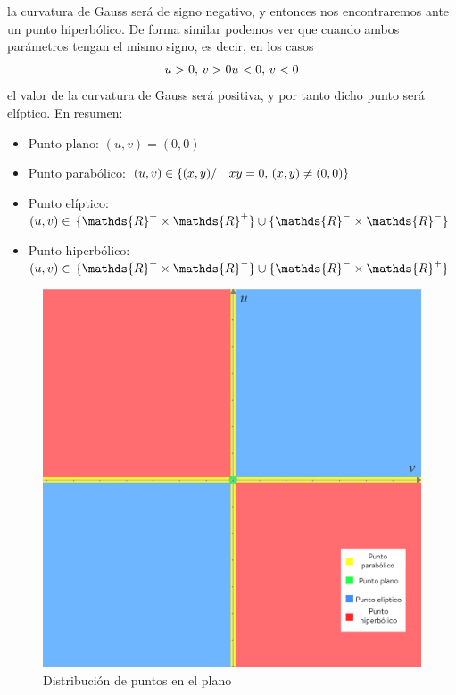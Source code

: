 \documentclass[fleqn]{article}
\def\R{\mathds{R}}
\begin{document}
    la curvatura de Gauss será de signo negativo, y entonces nos encontraremos ante un punto hiperbólico. De forma similar podemos ver que cuando ambos parámetros 
    tengan el mismo signo, es decir, en los casos
    \begin{equation*}
        u>0, \thinspace v>0 \\
        u<0, \thinspace v<0
    \end{equation*}
    el valor de la curvatura de Gauss será positiva, y por tanto dicho punto será elíptico. En resumen:
    \begin{itemize}
        \item Punto plano: $(u,v) = (0,0)$
        \item Punto parabólico: $(u,v) \in \{(x,y)/ \quad xy=0, \thinspace (x,y)\neq (0,0)\}$ 
        \item Punto elíptico: $(u,v) \in \thinspace \{\R^+ \times \R^+\} \cup \{\R^- \times \R^-\}$
        \item Punto hiperbólico: $(u,v) \in \thinspace \{\R^+ \times \R^-\} \cup \{\R^- \times \R^+\}$
    \end{itemize}
    \begin{figure}
        \centering
        \includegraphics[scale = 0.2]{grafica.png}
        \caption{Distribución de puntos en el plano}
    \end{figure}
\end{document}
